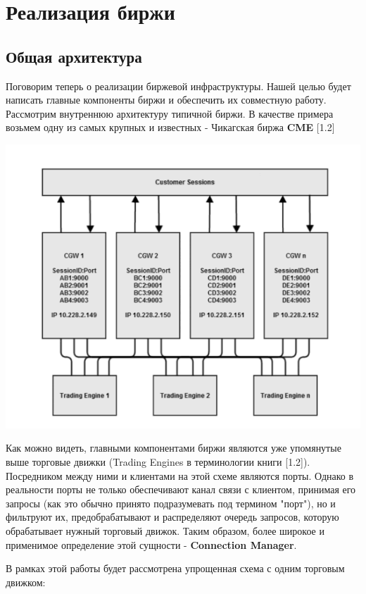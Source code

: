 \section{Реализация биржи}
\subsection{Общая архитектура}
Поговорим теперь о реализации биржевой инфраструктуры. Нашей целью будет написать главные компоненты биржи и обеспечить их совместную работу.
Рассмотрим внутреннюю архитектуру типичной биржи. В качестве примера возьмем одну из самых крупных и известных - Чикагская биржа \textbf{CME} [1.2]

\begin{center}
\includegraphics[width=400pt]{images/cme_schema.png}
\end{center}

Как можно видеть, главными компонентами биржи являются уже упомянутые выше торговые движки (Trading Engines в терминологии книги [1.2]). Посредником между ними и клиентами на этой схеме являются порты. Однако в реальности порты не только обеспечивают канал связи с клиентом, принимая его запросы (как это обычно принято подразумевать под термином "порт"), но и фильтруют их, предобрабатывают и распределяют очередь запросов, которую обрабатывает нужный торговый движок. Таким образом, более широкое и применимое определение этой сущности - \textbf{Connection Manager}.

В рамках этой работы будет рассмотрена упрощенная схема с одним торговым движком:


